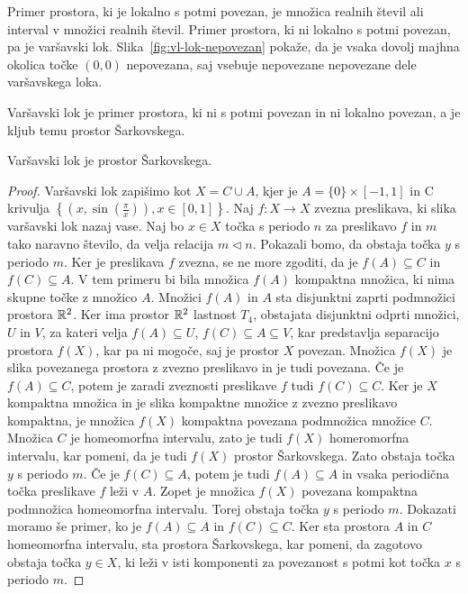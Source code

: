 \documentclass[../TG_magistrsko_delo_sections.tex]{subfiles}
\begin{document}
Primer prostora, ki je lokalno s potmi povezan, je množica realnih števil ali interval v množici realnih števil. Primer prostora, ki ni lokalno s potmi povezan, pa je varšavski lok. Slika~\ref{fig:vl-lok-nepovezan} pokaže, da je vsaka dovolj majhna okolica točke $(0, 0)$ nepovezana, saj vsebuje nepovezane nepovezane dele varšavskega loka.

Varšavski lok je primer prostora, ki ni s potmi povezan in ni lokalno povezan, a je kljub temu prostor Šarkovskega.


\begin{trditev}
Varšavski lok je prostor Šarkovskega.
\end{trditev}
\begin{proof}
Varšavski lok zapišimo kot $X = C \cup A$, kjer je $A= \{0\} \times [-1, 1]$ in C krivulja $\left\{\left(x, \sin\left(\frac{\pi}{x}\right)\right), x\in [0, 1]\right\}$. Naj $f : X \to X$ zvezna preslikava, ki slika varšavski lok nazaj vase. Naj bo $x \in X$ točka s periodo $n$ za preslikavo $f$ in $m$ tako naravno število, da velja relacija $m \triangleleft n$. Pokazali bomo, da obstaja točka $y$ s periodo $m$. Ker je preslikava $f$ zvezna, se ne more zgoditi, da je $f(A) \subseteq C$ in $f(C) \subseteq A$. V tem primeru bi bila množica $f(A)$ kompaktna množica, ki nima skupne točke z množico $A$. Množici $f(A)$ in $A$ sta disjunktni zaprti podmnožici prostora $\mathbb R^2$. Ker ima prostor $\mathbb R^2$ lastnost $T_4$, obstajata disjunktni odprti množici, $U$ in $V$, za kateri velja $f(A) \subseteq U$, $f(C) \subseteq A \subseteq V$, kar predstavlja separacijo prostora $f(X)$, kar pa ni mogoče, saj je prostor $X$ povezan. Množica $f(X)$ je slika povezanega prostora z zvezno preslikavo in je tudi povezana. Če je $f(A) \subseteq C$, potem je zaradi zveznosti preslikave $f$ tudi $f(C) \subseteq C$. Ker je $X$ kompaktna množica in je slika kompaktne množice z zvezno preslikavo kompaktna, je množica $f(X)$ kompaktna povezana podmnožica množice $C$. Množica $C$ je homeomorfna intervalu, zato je tudi $f(X)$ homeromorfna intervalu, kar pomeni, da je tudi $f(X)$ prostor Šarkovskega. Zato obstaja točka $y$ s periodo $m$. Če je $f (C) \subseteq A $, potem je tudi $f (A) \subseteq A $ in vsaka periodična točka preslikave $f$ leži v $A$.  Zopet je množica $f(X)$ povezana kompaktna podmnožica homeomorfna intervalu. Torej obstaja točka $y$ s periodo $m$. 
Dokazati moramo še primer, ko je $f (A) \subseteq A $ in $f (C) \subseteq C $. Ker sta prostora $A$ in $C$ homeomorfna intervalu, sta prostora Šarkovskega, kar pomeni, da zagotovo obstaja točka $y \in X$, ki leži v isti komponenti za povezanost s potmi kot točka $x$ s periodo $m$.
\end{proof}
\end{document}
